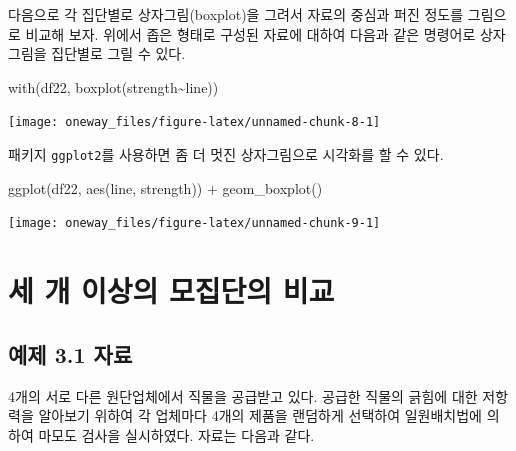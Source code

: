 \documentclass[
]{book}
\newenvironment{Shaded}{\begin{snugshade}}{\end{snugshade}}
\newcommand{\FunctionTok}[1]{\textcolor[rgb]{0.00,0.00,0.00}{#1}}
\newcommand{\NormalTok}[1]{#1}
\newcommand{\SpecialCharTok}[1]{\textcolor[rgb]{0.00,0.00,0.00}{#1}}
\begin{document}
다음으로 각 집단별로 상자그림(boxplot)을 그려서 자료의 중심과 퍼진 정도를 그림으로 비교해 보자. 위에서 좁은 형태로 구성된 자료에 대하여 다음과 같은 명령어로 상자그림을 집단별로 그릴 수 있다.

\begin{Shaded}
\begin{Highlighting}[]
\FunctionTok{with}\NormalTok{(df22, }\FunctionTok{boxplot}\NormalTok{(strength}\SpecialCharTok{\textasciitilde{}}\NormalTok{line))}
\end{Highlighting}
\end{Shaded}

\begin{center}\texttt{[image: oneway\_files/figure-latex/unnamed-chunk-8-1]} \end{center}

패키지 \texttt{ggplot2}를 사용하면 좀 더 멋진 상자그림으로 시각화를 할 수 있다.

\begin{Shaded}
\begin{Highlighting}[]
\FunctionTok{ggplot}\NormalTok{(df22, }\FunctionTok{aes}\NormalTok{(line, strength)) }\SpecialCharTok{+}  \FunctionTok{geom\_boxplot}\NormalTok{()}
\end{Highlighting}
\end{Shaded}

\begin{center}\texttt{[image: oneway\_files/figure-latex/unnamed-chunk-9-1]} \end{center}

\hypertarget{uxc138-uxac1c-uxc774uxc0c1uxc758-uxbaa8uxc9d1uxb2e8uxc758-uxbe44uxad50}{%
\section{세 개 이상의 모집단의 비교}\label{uxc138-uxac1c-uxc774uxc0c1uxc758-uxbaa8uxc9d1uxb2e8uxc758-uxbe44uxad50}}

\hypertarget{uxc608uxc81c-3.1-uxc790uxb8cc}{%
\subsection{예제 3.1 자료}\label{uxc608uxc81c-3.1-uxc790uxb8cc}}

4개의 서로 다른 원단업체에서 직물을 공급받고 있다. 공급한 직물의 긁힘에 대한 저항력을 알아보기 위하여 각 업체마다 4개의 제품을 랜덤하게 선택하여 일원배치법에 의하여 마모도 검사을 실시하였다. 자료는 다음과 같다.
\end{document}
